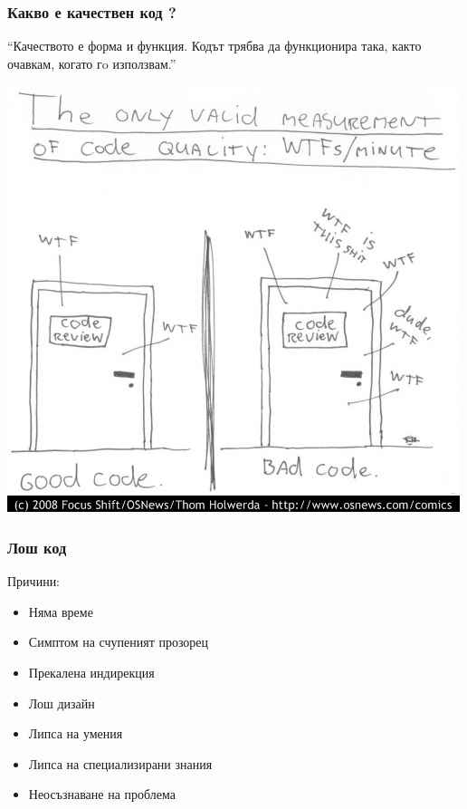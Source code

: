 
\begin{frame}
  \frametitle{Какво е качествен код ?}

\begin{exampleblock}{}
  {\large ``Качеството е форма и функция.  Кодът трябва да функционира така, както очавкам, когато гo използвам.''}
\end{exampleblock}
\end{frame}

\begin{frame}
   \begin{center}
   \includegraphics[width=\textwidth,height=0.8\textheight,keepaspectratio]{wtfm.jpg}
   \end{center}
\end{frame}

\begin{frame}
  \frametitle{Лош код}
  Причини:
  \begin{itemize}
  \item Няма време
  \item Симптом на счупеният прозорец
  \item Прекалена индирекция
  \item Лош дизайн
  \item Липса на умения
  \item Липса на специализирани знания
  \item Неосъзнаване на проблема
  \end{itemize}
\end{frame}

